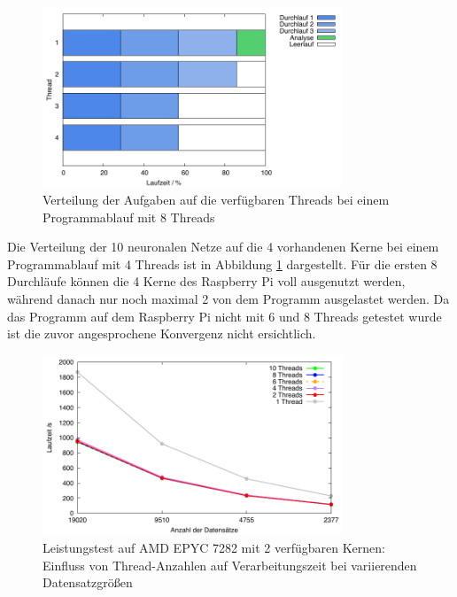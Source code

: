 \begin{figure}[htbp!]
  \centering
  \includegraphics[width=0.8\textwidth]{../results/plots/timeline/timeline_plot_4threads.pdf}
  \caption{Verteilung der Aufgaben auf die verfügbaren Threads bei einem Programmablauf mit 8 Threads}
  \label{fig:runtime_timeline_4threads}
\end{figure}

Die Verteilung der 10 neuronalen Netze auf die 4 vorhandenen Kerne bei einem Programmablauf mit 4 Threads ist in Abbildung \ref{fig:runtime_timeline_4threads} dargestellt. Für die ersten 8 Durchläufe können die 4 Kerne des Raspberry Pi voll ausgenutzt werden, während danach nur noch maximal 2 von dem Programm ausgelastet werden. Da das Programm auf dem Raspberry Pi nicht mit 6 und 8 Threads getestet wurde ist die zuvor angesprochene Konvergenz nicht ersichtlich.

\begin{figure}[H]
\centering
\includegraphics[width=0.8\textwidth]{../results/plots/vps/comp_all_threads.pdf}
\caption{Leistungstest auf AMD EPYC 7282 mit 2 verfügbaren Kernen: Einfluss von Thread-Anzahlen auf Verarbeitungszeit bei variierenden Datensatzgrößen}
\label{fig:vps_benchmark_threads}
\end{figure}

